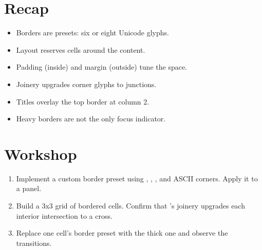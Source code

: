 \section{Recap}

\begin{recap}
\begin{itemize}[leftmargin=*]
  \item Borders are presets: six or eight Unicode glyphs.
  \item Layout reserves cells around the content.
  \item Padding (inside) and margin (outside) tune the space.
  \item Joinery upgrades corner glyphs to junctions.
  \item Titles overlay the top border at column 2.
  \item Heavy borders are not the only focus indicator.
\end{itemize}
\end{recap}

\section*{Workshop}

\begin{enumerate}[leftmargin=*]
  \item Implement a custom border preset using \code{+},
    \code{=}, \code{|}, and ASCII corners. Apply it to a
    panel.
  \item Build a 3x3 grid of bordered cells. Confirm that
    \maya{}'s joinery upgrades each interior intersection to
    a cross.
  \item Replace one cell's border preset with the thick one
    and observe the transitions.
\end{enumerate}
